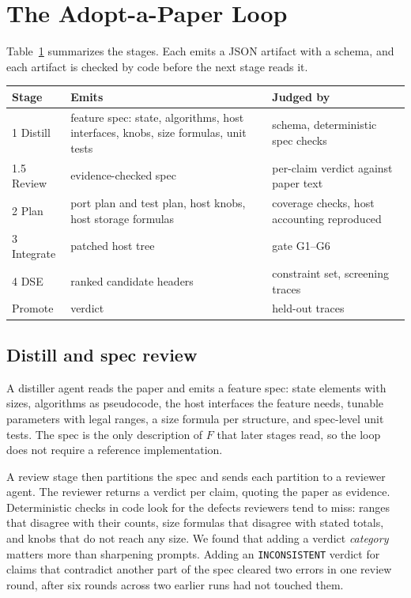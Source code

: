 \documentclass[conference]{IEEEtran}
\begin{document}
\section{The Adopt-a-Paper Loop}\label{sec:loop}

Table~\ref{tab:stages} summarizes the stages. Each emits a JSON artifact with a
schema, and each artifact is checked by code before the next stage reads it.

\begin{table}[t]
\label{tab:stages}
\centering
\footnotesize
\begin{tabular}{@{}p{}p{}p{}@{}}
\toprule
Stage & Emits & Judged by \\
\midrule
1 Distill & feature spec: state, algorithms, host interfaces, knobs, size formulas, unit tests & schema, deterministic spec checks \\
1.5 Review & evidence-checked spec & per-claim verdict against paper text \\
2 Plan & port plan and test plan, host knobs, host storage formulas & coverage checks, host accounting reproduced \\
3 Integrate & patched host tree & gate G1--G6 \\
4 DSE & ranked candidate headers & constraint set, screening traces \\
Promote & verdict & held-out traces \\
\bottomrule
\end{tabular}
\end{table}

\subsection{Distill and spec review}

A distiller agent reads the paper and emits a feature spec: state elements with
sizes, algorithms as pseudocode, the host interfaces the feature needs, tunable
parameters with legal ranges, a size formula per structure, and spec-level unit
tests. The spec is the only description of $F$ that later stages read, so the
loop does not require a reference implementation.

A review stage then partitions the spec and sends each partition to a reviewer
agent. The reviewer returns a verdict per claim, quoting the paper as evidence.
Deterministic checks in code look for the defects reviewers tend to miss:
ranges that disagree with their counts, size formulas that disagree with stated
totals, and knobs that do not reach any size. We found that adding a verdict
\emph{category} matters more than sharpening prompts. Adding an
\texttt{INCONSISTENT} verdict for claims that contradict another part of the
spec cleared two errors in one review round, after six rounds across two
earlier runs had not touched them.
\end{document}
